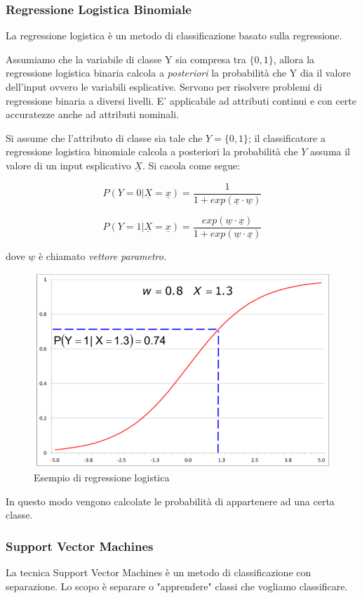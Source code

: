 \subsubsection{Regressione Logistica Binomiale}
La regressione logistica è un metodo di classificazione basato sulla regressione.

Assumiamo che la variabile di classe Y sia compresa tra $\{0,1\}$, allora la regressione logistica binaria calcola a \textit{posteriori} la probabilità che Y dia il valore dell'input ovvero le variabili esplicative.
Servono per risolvere problemi di regressione binaria a diversi livelli. E' applicabile ad attributi continui e con certe accuratezze anche ad attributi nominali.

Si assume che l'attributo di classe sia tale che $Y = \{0,1\}$;  il classificatore a regressione logistica binomiale calcola a posteriori la probabilità che $Y$ assuma il valore di un input esplicativo $\underline{X}$. Si cacola come segue:

\[P(Y = 0 | \underline{X}= \underline{x}) = \frac{1}{1+exp(\underline{x} \cdot \underline{w})}\]

\[P(Y = 1 | \underline{X}= \underline{x}) = \frac{exp(\underline{w} \cdot \underline{x})}{1+exp(\underline{w} \cdot \underline{x})}\]

dove $\underline{w}$ è chiamato \textit{vettore parametro.}

\begin{figure}[H]
	\centering
	\includegraphics[height=0.5 \linewidth]{classification/pict/regr_logistic.png}
	\caption{Esempio di regressione logistica}
\end{figure}

In questo modo vengono calcolate le probabilità di appartenere ad una certa classe.	 

\subsubsection{Support Vector Machines}
La tecnica Support Vector Machines è un metodo di classificazione con separazione. Lo scopo è separare o "apprendere" classi che vogliamo classificare. 

